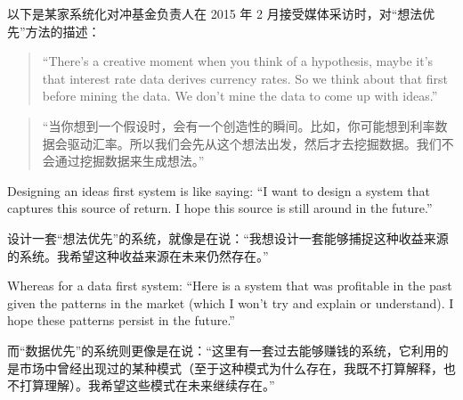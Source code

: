 \begin{chineseblock}以下是某家系统化对冲基金负责人在 2015 年 2 月接受媒体采访时，对“想法优先”方法的描述：\end{chineseblock}

\begin{quote}
\begingroup\color{\englishbodycolorname} ``There's a creative moment when you think of a hypothesis, maybe it's that interest rate data derives currency rates. So we think about that first before mining the data. We don't mine the data to come up with ideas.'' \endgroup
\end{quote}

\begin{quote}
\begingroup\color{\chinesebodycolorname}“当你想到一个假设时，会有一个创造性的瞬间。比如，你可能想到利率数据会驱动汇率。所以我们会先从这个想法出发，然后才去挖掘数据。我们不会通过挖掘数据来生成想法。”\endgroup
\end{quote}

\begin{englishblock} Designing an ideas first system is like saying: ``I want to design a system that captures this source of return. I hope this source is still around in the future.'' \end{englishblock}

\begin{chineseblock}设计一套“想法优先”的系统，就像是在说：“我想设计一套能够捕捉这种收益来源的系统。我希望这种收益来源在未来仍然存在。”\end{chineseblock}

\bipairgap

\begin{englishblock} Whereas for a data first system: ``Here is a system that was profitable in the past given the patterns in the market (which I won't try and explain or understand). I hope these patterns persist in the future.'' \end{englishblock}

\begin{chineseblock}而“数据优先”的系统则更像是在说：“这里有一套过去能够赚钱的系统，它利用的是市场中曾经出现过的某种模式（至于这种模式为什么存在，我既不打算解释，也不打算理解）。我希望这些模式在未来继续存在。”\end{chineseblock}

